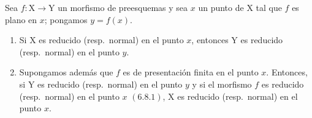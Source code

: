\begin{proposition}[11.3.13]
\label{IV.11.3.13}
Sea $f:\mathrm{X}\to\mathrm{Y}$ un morfismo de preesquemas y sea $x$ un punto de $\mathrm{X}$ tal que $f$ es plano en $x$; pongamos $y=f(x)$.
\begin{enumerate}[label=\emph{(\roman*)}]
  \item Si $\mathrm{X}$ es reducido (resp.\ normal) en el punto $x$, entonces $\mathrm{Y}$ es reducido (resp.\ normal) en el punto $y$.
  \item Supongamos además que $f$ es de presentación finita en el punto $x$. Entonces, si $\mathrm{Y}$ es reducido (resp.\ normal) en el punto $y$ y si el morfismo $f$ es reducido (resp.\ normal) en el punto $x$ $(6.8.1)$, $\mathrm{X}$ es reducido (resp.\ normal) en el punto $x$.
\end{enumerate}
\end{proposition}

